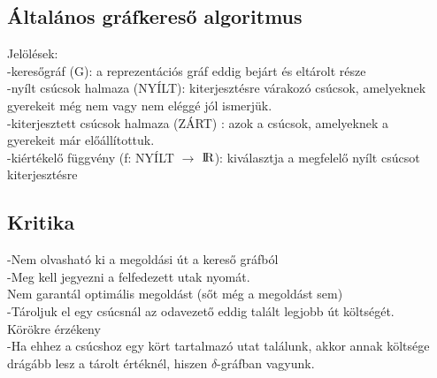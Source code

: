 \documentclass{article}
\begin{document}
	 \subsection{Általános gráfkereső algoritmus}
	 Jelölések:\\
	 \hspace*{1em} -keresőgráf (G): a reprezentációs gráf eddig bejárt és eltárolt része\\
	 \hspace*{1em}-nyílt csúcsok halmaza (NYÍLT): kiterjesztésre várakozó csúcsok, amelyeknek\\
	 \hspace*{1em} gyerekeit még nem vagy nem eléggé jól ismerjük. \\
	 \hspace*{1em} -kiterjesztett csúcsok halmaza (ZÁRT) : azok a csúcsok, amelyeknek a \\
	 \hspace*{1em} gyerekeit már előállítottuk.\\
	 \hspace*{1em} -kiértékelő függvény (f: NYÍLT $\rightarrow$  ${\rm I\!R}$): kiválasztja a megfelelő nyílt csúcsot \\
	 \hspace*{1em}kiterjesztésre
	 
	 \subsection{Kritika}
	 -Nem olvasható ki a megoldási út a kereső gráfból\\
	 \hspace*{1em} -Meg kell jegyezni a felfedezett utak nyomát.\\
	 Nem garantál optimális megoldást (sőt még a megoldást sem)\\
	 \hspace*{1em} -Tároljuk el egy csúcsnál az odavezető eddig talált legjobb út költségét.\\
	 Körökre érzékeny\\
	 \hspace*{1em} -Ha ehhez a csúcshoz egy kört tartalmazó utat találunk, akkor annak költsége\\
	 \hspace*{1em}  drágább lesz a tárolt értéknél, hiszen $\delta$-gráfban vagyunk.
	 
\end{document}
